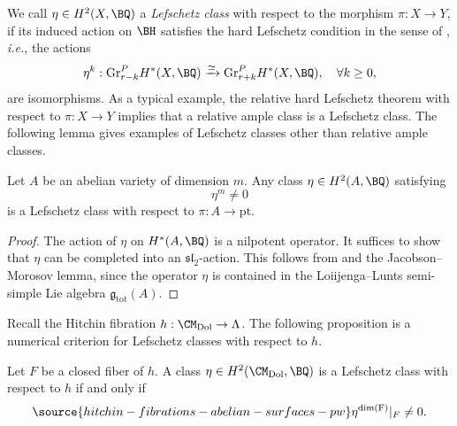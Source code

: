 We call $\eta \in H^2(X, \BQ)$ a \emph{Lefschetz class} with respect to the morphism $\pi: X\to Y$, if its induced action on $\BH$ satisfies the hard Lefschetz condition in the sense of \cite[Assumption 2.3.1]{dC}, \emph{i.e.}, the actions
\[
\eta^k: \mathrm{Gr}^P_{r-k}H^*(X, \BQ) \xrightarrow{\simeq}  \mathrm{Gr}^P_{r+k}H^*(X, \BQ), \quad \forall k\geq 0,
\]
are isomorphisms. As a typical example, the relative hard Lefschetz theorem \cite{BBD} with respect to $\pi: X \to Y$ implies that a relative ample class is a Lefschetz class. The following lemma gives examples of Lefschetz classes other than relative ample classes.

\begin{lem}
\notready\label{Lemma3.1}
Let $A$ be an abelian variety of dimension $m$. Any class $\eta \in H^2(A, \BQ)$ satisfying
\[
\eta^m \neq 0
\]
is a Lefschetz class with respect to $\pi: A \to \mathrm{pt}$.
\end{lem}

\begin{proof}
The action of $\eta$ on $H^*(A, \BQ)$ is a nilpotent operator. It suffices to show that $\eta$ can be completed into an $\mathfrak{sl}_2$-action. This follows from \cite[Proposition 3.3]{LL} and the Jacobson--Morosov lemma, since the operator $\eta$ is contained in the Loiijenga--Lunts semi-simple Lie algebra $\mathfrak{g}_{\mathrm{tot}}(A)$.
\end{proof}

Recall the Hitchin fibration $h: \CM_{\mathrm{Dol}} \to \Lambda$. The following proposition is a numerical criterion for Lefschetz classes with respect to $h$.

\begin{prop}
\notready\label{prop3.2_Hitchin}
Let $F$ be a closed fiber of $h$. A class $\eta \in H^2(\CM_{\mathrm{Dol}}, \BQ)$ is a Lefschetz class with respect to $h$ if and only if
\begin{equation}\label{eqn50}
\source{hitchin-fibrations-abelian-surfaces-pw}
\eta^{\mathrm{dim(F)}}|_{F} \neq 0.
\end{equation}
\end{prop}

